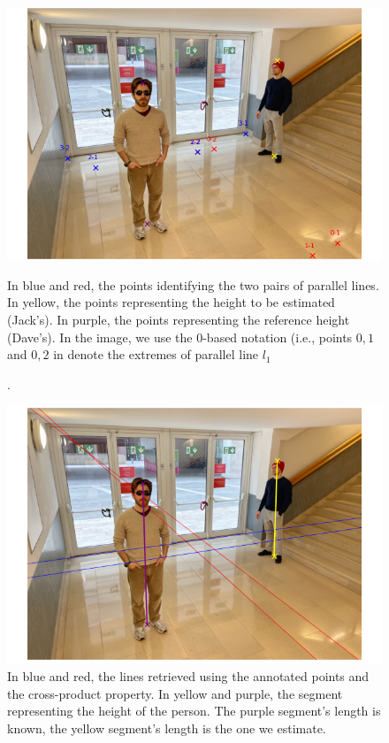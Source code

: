 \begin{figure}[htbp]
    \centering
    \begin{minipage}[t]{0.48\textwidth}
        \centering
        \includegraphics[width=\linewidth]{img/annotated_points.png}
        \vspace{-5pt}  %
        \caption{In blue and red, the points identifying the two pairs of parallel lines. In yellow, the points representing the height to be estimated (Jack's). In purple, the points representing the reference height (Dave's). In the image, we use the 0-based notation (i.e., points $0,1$ and $0,2$ in denote the extremes of parallel line $l_1$}.
        \label{fig:annotated_points}
    \end{minipage}
    \hfill
    \begin{minipage}[t]{0.48\textwidth}
        \centering
        \includegraphics[width=\linewidth]{img/retrieved_lines.png}
        \vspace{-5pt}  %
        \caption{In blue and red, the lines retrieved using the annotated points and the cross-product property. In yellow and purple, the segment representing the height of the person. The purple segment's length is known, the yellow segment's length is the one we estimate.}
        \label{fig:retrieved_lines}
    \end{minipage}
\end{figure}

